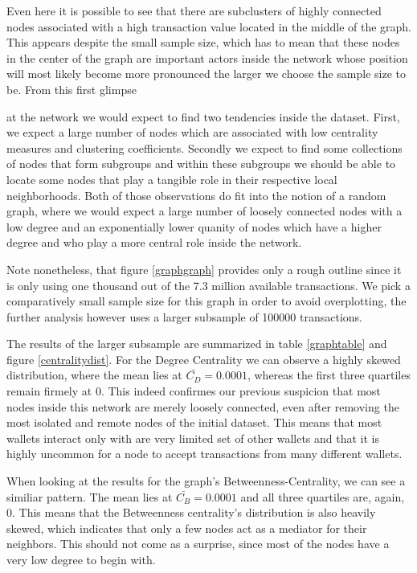 Even here it is possible to see that there are subclusters of highly connected nodes associated with a high transaction value located in the middle of the graph. 
This appears despite the small sample size, which has to mean that these nodes in the center of the graph are important actors inside the network whose position will most likely become more pronounced the larger we choose the sample size to be. 
From this first glimpse{\par}

\noindent at the network we would expect to find two tendencies inside the dataset. 
First, we expect a large number of nodes which are associated with low centrality measures and clustering coefficients. 
Secondly we expect to find some collections of nodes that form subgroups and within these subgroups we should be able to locate some nodes that play a tangible role in their respective local neighborhoods. Both of those observations do fit into the notion of a random graph, where we would expect a large number of loosely connected nodes with a low degree and an exponentially lower quanity of nodes which have a higher degree and who play a more central role inside the network.

Note nonetheless, that figure \ref{graphgraph} provides only a rough outline since it is only using one thousand out of the 7.3 million available transactions. 
We pick a comparatively small sample size for this graph in order to avoid overplotting, the further analysis however uses a larger subsample of 100000 transactions.

The results of the larger subsample are summarized in table \ref{graphtable} and figure \ref{centralitydist}. 
For the Degree Centrality we can observe a highly skewed distribution, where the mean lies at $\bar{C_D} = 0.0001$, whereas the first three quartiles remain firmely at $0$. 
This indeed confirmes our previous suspicion that most nodes inside this network are merely loosely connected, even after removing the most isolated and remote nodes of the initial dataset. 
This means that most wallets interact only with are very limited set of other wallets and that it is highly uncommon for a node to accept transactions from many different wallets.

When looking at the results for the graph's Betweenness-Centrality, we can see a similiar pattern. 
The mean lies at $\bar{C_B}=0.0001$ and all three quartiles are, again, $0$. This means that the Betweenness centrality's distribution is also heavily skewed, which indicates that only a few nodes act as a mediator for their neighbors. 
This should not come as a surprise, since most of the nodes have a very low degree to begin with.

